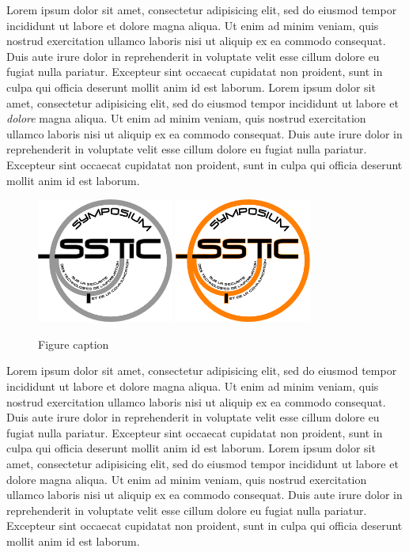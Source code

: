 Lorem ipsum dolor sit amet, consectetur adipisicing elit, sed do
eiusmod tempor incididunt ut labore et dolore magna aliqua. Ut enim ad
minim veniam, quis nostrud exercitation ullamco laboris nisi ut
aliquip ex ea commodo consequat. Duis aute irure dolor in
reprehenderit in voluptate velit esse cillum dolore eu fugiat nulla
pariatur. Excepteur sint occaecat cupidatat non proident, sunt in
culpa qui officia deserunt mollit anim id est laborum. Lorem ipsum
dolor sit amet, consectetur adipisicing elit, sed do eiusmod tempor
incididunt ut labore et \emph{dolore} magna aliqua. Ut enim ad minim
veniam, quis nostrud exercitation ullamco laboris nisi ut aliquip ex
ea commodo consequat. Duis aute irure dolor in reprehenderit in
voluptate velit esse cillum dolore eu fugiat nulla pariatur. Excepteur
sint occaecat cupidatat non proident, sunt in culpa qui officia
deserunt mollit anim id est laborum.


\begin{figure}[ht]
  \centering
  \ifssticbw
    \includegraphics[width=0.4\textwidth]{MonNom/img/bw-archi}
  \else
    \includegraphics[width=0.4\textwidth]{MonNom/img/archi}
  \fi
  \caption{Figure caption}
  \label{fig:myname:archi}
\end{figure}

Lorem ipsum dolor sit amet, consectetur adipisicing elit, sed do
eiusmod tempor incididunt ut labore et dolore magna aliqua. Ut enim ad
minim veniam, quis nostrud exercitation ullamco laboris nisi ut
aliquip ex ea commodo consequat. Duis aute irure dolor in
reprehenderit in voluptate velit esse cillum dolore eu fugiat nulla
pariatur. Excepteur sint occaecat cupidatat non proident, sunt in
culpa qui officia deserunt mollit anim id est laborum. Lorem ipsum
dolor sit amet, consectetur adipisicing elit, sed do eiusmod tempor
incididunt ut labore et dolore magna aliqua. Ut enim ad minim veniam,
quis nostrud exercitation ullamco laboris nisi ut aliquip ex ea
commodo consequat. Duis aute irure dolor in reprehenderit in voluptate
velit esse cillum dolore eu fugiat nulla pariatur. Excepteur sint
occaecat cupidatat non proident, sunt in culpa qui officia deserunt
mollit anim id est laborum.


